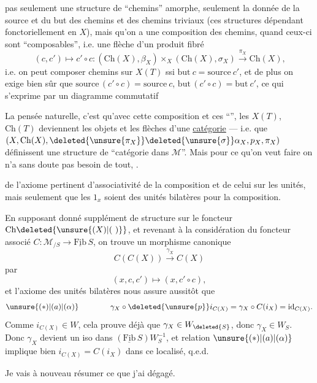  pas seulement une structure de  ``chemins''  amorphe,  seulement la donnée de la source et du but des chemins et des chemins triviaux (ces structures  dépendant fonctoriellement en $X$), mais qu'on a une composition des chemins, quand  ceux-ci sont ``composables'', i.e. une  flèche d'un produit fibré
\[
(c,c')\longmapsto c'\circ c:(\mathrm{Ch}(X),\beta_X)\times_X(\mathrm{Ch}(X),\sigma_X)\xrightarrow{\pi_X}\mathrm{Ch}(X)\text{,}
\]
i.e. on peut composer  chemins sur  $X(T)$
ssi $\mathrm{but}\ c=\mathrm{source}\ c'$, et de plus on exige bien sûr que $\mathrm{source}\,(c'\circ c)=\mathrm{source}\ c$, $\mathrm{but}\,(c'\circ c)=\mathrm{but}\ c'$, ce qui s'exprime par un diagramme commutatif

La pensée naturelle, c'est qu'avec cette composition et ces ``'', les $X(T)$, $\mathrm{Ch}(T)$ deviennent les objets et les flèches d'une \uline{catégorie} --- i.e. que $(X,\mathrm{Ch}(X),\deleted{\unsure{\pi_X}}\deleted{\unsure{\sigma}}\alpha_X,p_X,\pi_X)$ définissent une structure de ``catégorie dans $\mathcal M$''. Mais pour ce qu'on veut faire  on n'a sans doute pas besoin de tout,  .

de l'axiome pertinent d'associativité de la composition
et de celui sur les unités, mais seulement que
les $1_x$ soient des unités bilatères pour la
composition.

En supposant donné  supplément de
structure sur le foncteur $\mathrm{Ch}\deleted{\unsure{(X)|(\ )}}$,  et
revenant à la considération du foncteur
associé $C:\mathcal M_{/S}\longrightarrow\underline{\mathrm{Fib}}\,S$,
on trouve un morphisme canonique
\[
C(C(X))\xrightarrow{\gamma_X}C(X)
\]
par
\[
(x,c,c')\longmapsto(x,c'\circ c),
\]
et l'axiome des unités bilatères nous
assure aussitôt que
\[
\unsure{(*)|(a)|(\alpha)}\qquad\qquad \gamma_X\circ\deleted{\unsure{p}}i_{C(X)}=\gamma_X\circ C(i_X)=\mathrm{id}_{C(X)}.
\]
Comme $i_{C(X)}\in W$, cela prouve déjà que
$\gamma_X\in W_{\deleted{S}}$, donc $\gamma_X\in W_S$. Donc $\gamma_X$ devient
un iso dans $(\underline{\mathrm{Fib}}\,S)W_S^{-1}$, et 
relation $\unsure{(*)|(a)|(\alpha)}$ implique bien $i_{C(X)}=C(i_X)$
dans ce localisé, q.e.d.

Je vais à nouveau résumer ce que j'ai
dégagé.
